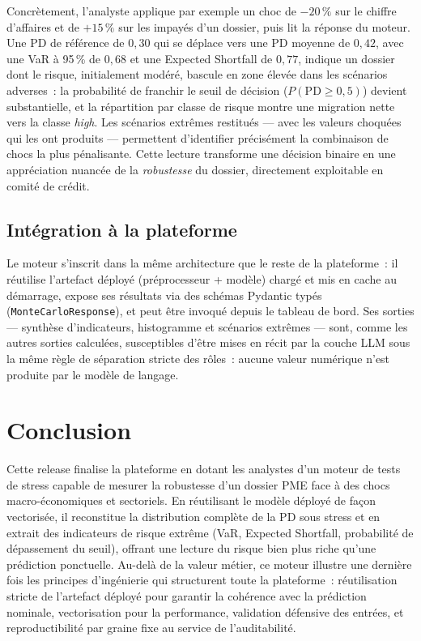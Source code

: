 \documentclass[a4paper,12pt,oneside]{report}
\begin{document}
Concrètement, l'analyste applique par exemple un choc de $-20\,\%$ sur le chiffre d'affaires et
de $+15\,\%$ sur les impayés d'un dossier, puis lit la réponse du moteur. Une PD de référence de
$0{,}30$ qui se déplace vers une PD moyenne de $0{,}42$, avec une VaR à 95\,\% de $0{,}68$ et une
Expected Shortfall de $0{,}77$, indique un dossier dont le risque, initialement modéré, bascule
en zone élevée dans les scénarios adverses~: la probabilité de franchir le seuil de décision
($P(\text{PD}\geq 0{,}5)$) devient substantielle, et la répartition par classe de risque montre
une migration nette vers la classe \textit{high}. Les scénarios extrêmes restitués — avec les
valeurs choquées qui les ont produits — permettent d'identifier précisément la combinaison de
chocs la plus pénalisante. Cette lecture transforme une décision binaire en une appréciation
nuancée de la \emph{robustesse} du dossier, directement exploitable en comité de crédit.

\subsection{Intégration à la plateforme}

Le moteur s'inscrit dans la même architecture que le reste de la plateforme~: il réutilise
l'artefact déployé (préprocesseur + modèle) chargé et mis en cache au démarrage, expose ses
résultats via des schémas Pydantic typés (\texttt{MonteCarloResponse}), et peut être invoqué
depuis le tableau de bord. Ses sorties — synthèse d'indicateurs, histogramme et scénarios
extrêmes — sont, comme les autres sorties calculées, susceptibles d'être mises en récit par
la couche LLM sous la même règle de séparation stricte des rôles~: aucune valeur numérique
n'est produite par le modèle de langage.

\section*{Conclusion}

Cette release finalise la plateforme en dotant les analystes d'un moteur de tests de stress
capable de mesurer la robustesse d'un dossier PME face à des chocs macro-économiques et
sectoriels. En réutilisant le modèle déployé de façon vectorisée, il reconstitue la distribution
complète de la PD sous stress et en extrait des indicateurs de risque extrême (VaR, Expected
Shortfall, probabilité de dépassement du seuil), offrant une lecture du risque bien plus riche
qu'une prédiction ponctuelle. Au-delà de la valeur métier, ce moteur illustre une dernière fois
les principes d'ingénierie qui structurent toute la plateforme~: réutilisation stricte de
l'artefact déployé pour garantir la cohérence avec la prédiction nominale, vectorisation pour la
performance, validation défensive des entrées, et reproductibilité par graine fixe au service de
l'auditabilité.
\end{document}
